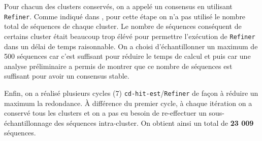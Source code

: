 \documentclass[10pt]{article}
\begin{document}
Pour chacun des clusters conservés, on a appelé un consensus en utilisant \texttt{Refiner}. Comme indiqué dans \subsectionautorefname{ \ref{subsec:lib_construction}}, pour cette étape on n'a pas utilisé le nombre total de séquences de chaque cluster. Le nombre de séquences conséquent  de certains cluster était beaucoup trop élévé pour permettre l'exécution de \texttt{Refiner} dans un délai de temps raisonnable. On a choisi d'échantillonner un maximum de 500 séquences car c'est suffisant pour réduire le temps de calcul et puis car une analyse préliminaire a permis de montrer que ce nombre de séquences est suffisant pour avoir un consensus stable. 




Enfin, on a réalisé plusieurs cycles (7) \texttt{cd-hit-est}/\texttt{Refiner} de façon à réduire un maximum la redondance. \`A différence du premier cycle, à chaque itération on a conservé tous les clusters et on a pas eu besoin de re-effectuer un sous-échantillonnage des séquences intra-cluster. On obtient ainsi un total de  \textbf{23 009} séquences. \\

\end{document}
